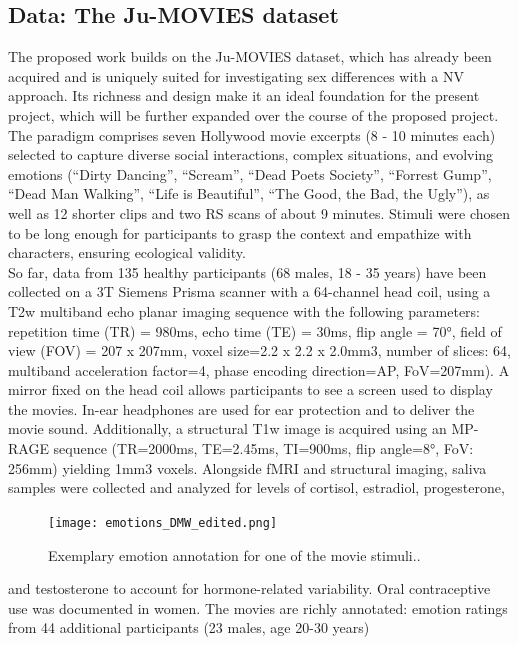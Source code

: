 \documentclass[11pt,a4paper]{article}
\begin{document}
\subsection*{Data: The Ju-MOVIES dataset}
The proposed work builds on the Ju-MOVIES dataset, which has already been acquired and is 
uniquely suited for investigating sex differences with a NV approach. Its richness and design make it an ideal 
foundation for the present project, which will be further expanded over the course of the proposed project. 
The paradigm comprises seven Hollywood movie excerpts (8 - 10 minutes each) selected to capture diverse social 
interactions, complex situations, and evolving emotions (“Dirty Dancing”, “Scream”, “Dead Poets Society”, “Forrest Gump”, “Dead Man Walking”, “Life is Beautiful”, 
“The Good, the Bad, the Ugly”), as well as 12 shorter clips and two RS scans of about 9 minutes.
Stimuli were chosen to be long enough for participants to grasp the context and empathize with characters, 
ensuring ecological validity.\\
So far, data from 135 healthy participants (68 males, 18 - 35 years) have been collected 
on a 3T Siemens Prisma scanner
with a 64-channel head coil, using a T2w multiband echo planar imaging sequence with the 
following parameters: repetition time (TR) = 980ms, echo time (TE) = 30ms, flip angle = 70°, field of view 
(FOV) = 207 x 207mm, voxel size=2.2 x 2.2 x 2.0mm3, number of slices: 64, multiband acceleration factor=4, 
phase encoding direction=AP,  FoV=207mm). A mirror fixed on the head coil allows participants to see a screen used 
to display the movies. In-ear headphones are used for ear protection and to deliver the movie sound. 
Additionally, a structural T1w image is acquired using an MP-RAGE sequence (TR=2000ms, TE=2.45ms, TI=900ms, 
flip angle=8°, FoV: 256mm) yielding 1mm3 voxels.
Alongside fMRI and structural imaging, saliva samples were collected and analyzed for levels of cortisol, estradiol, progesterone,
\begin{figure} %
  \vspace{-10pt} %
  \texttt{[image: emotions\_DMW\_edited.png]}
  \caption{Exemplary emotion annotation for one of the movie stimuli..}
  \label{fig:dmw}
\end{figure}
 and testosterone to account for hormone-related variability. 
Oral contraceptive use was documented in women.
The movies are richly annotated: 
emotion ratings from 44 additional participants (23 males, age 20-30 years)
\end{document}
